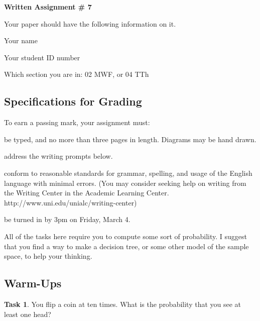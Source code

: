 \documentclass[12pt,letterpaper]{article}
\theoremstyle{definition}
\newtheorem{task}{Task}
\begin{document}
\setlength{\parskip}{1ex plus 0.5ex minus 0.2ex}
\setlength{\parindent}{0pt}

\pagestyle{fancy}
\lfoot{}
\rfoot{}

\begin{center}
{
\Large
\textbf{Written Assignment \# 7}
}
\end{center}

Your paper should have the following information on it.
\begin{compactitem}
\item Your name
\item Your student ID number 
\item Which section you are in: 02 MWF, or 04 TTh
\end{compactitem}


\subsection*{Specifications for Grading}

To earn a passing mark, your assignment must:
\begin{compactitem}
\item be typed, and no more than three pages in length. Diagrams may be hand drawn.
\item address the writing prompts below.
\item conform to reasonable standards for grammar, spelling, and usage of the English language with minimal errors. (You may consider seeking help on writing from the Writing Center in the Academic Learning Center. http://www.uni.edu/unialc/writing-center)
\item be turned in by 3pm on Friday, March 4.
\end{compactitem}

All of the tasks here require you to compute some sort of probability. I suggest that you find a way to make a decision tree, or some other model of the sample space, to help your thinking.

\subsection*{Warm-Ups}

\begin{task}
You flip a coin at ten times. What is the probability that you see at least one head?
\end{task}
\end{document}
